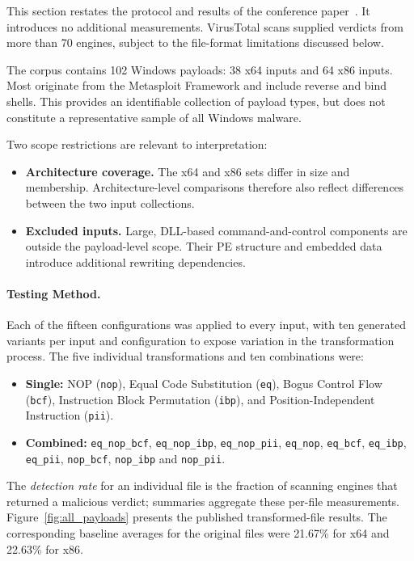 \documentclass[runningheads]{llncs}
\begin{document}
This section restates the protocol and results of the conference paper~\cite{zone_secrypt_2026}. It introduces no additional measurements. VirusTotal scans supplied verdicts from more than 70 engines, subject to the file-format limitations discussed below.

The corpus contains 102 Windows payloads: 38 x64 inputs and 64 x86 inputs. Most originate from the Metasploit Framework and include reverse and bind shells. This provides an identifiable collection of payload types, but does not constitute a representative sample of all Windows malware.

Two scope restrictions are relevant to interpretation:
\begin{itemize}
    \item \textbf{Architecture coverage.} The x64 and x86 sets differ in size and membership. Architecture-level comparisons therefore also reflect differences between the two input collections.
    \item \textbf{Excluded inputs.} Large, DLL-based command-and-control components are outside the payload-level scope. Their PE structure and embedded data introduce additional rewriting dependencies.

\end{itemize}

\paragraph{Testing Method.}
Each of the fifteen configurations was applied to every input, with ten generated variants per input and configuration to expose variation in the transformation process. The five individual transformations and ten combinations were:

\begin{itemize}
    \item \textbf{Single:} NOP (\texttt{nop}), Equal Code Substitution (\texttt{eq}), Bogus Control Flow (\texttt{bcf}), Instruction Block Permutation (\texttt{ibp}), and Position-Independent Instruction (\texttt{pii}).
    \item \textbf{Combined:} \texttt{eq\_nop\_bcf}, \texttt{eq\_nop\_ibp}, \texttt{eq\_nop\_pii}, \texttt{eq\_nop}, \texttt{eq\_bcf}, \texttt{eq\_ibp}, \texttt{eq\_pii}, \texttt{nop\_bcf}, \texttt{nop\_ibp} and \texttt{nop\_pii}.
\end{itemize}

The \emph{detection rate} for an individual file is the fraction of scanning engines that returned a malicious verdict; summaries aggregate these per-file measurements. Figure~\ref{fig:all_payloads} presents the published transformed-file results. The corresponding baseline averages for the original files were 21.67\% for x64 and 22.63\% for x86.
\end{document}
